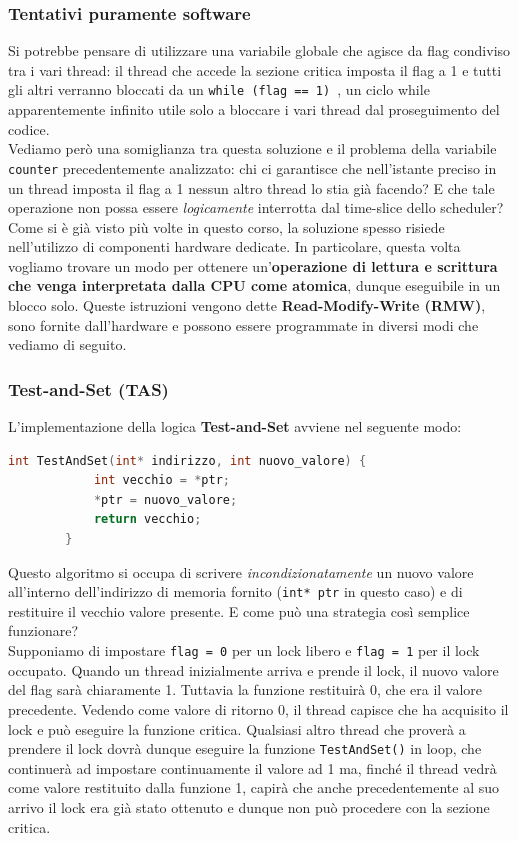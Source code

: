 \documentclass[12pt]{report}
\begin{document}
	\subsubsection*{Tentativi puramente software}
	Si potrebbe pensare di utilizzare una variabile globale che agisce da flag condiviso tra i vari thread: il thread che accede la sezione critica imposta il flag a 1 e tutti gli altri verranno bloccati da un \texttt{while (flag == 1) {}}, un ciclo while apparentemente infinito utile solo a bloccare i vari thread dal proseguimento del codice.\\
	Vediamo però una somiglianza tra questa soluzione e il problema della variabile \texttt{counter} precedentemente analizzato: chi ci garantisce che nell'istante preciso in un thread imposta il flag a 1 nessun altro thread lo stia già facendo? E che tale operazione non possa essere \textit{logicamente} interrotta dal time-slice dello scheduler?\\
	Come si è già visto più volte in questo corso, la soluzione spesso risiede nell'utilizzo di componenti hardware dedicate. In particolare, questa volta vogliamo trovare un modo per ottenere un'\textbf{operazione di lettura e scrittura che venga interpretata dalla CPU come atomica}, dunque eseguibile in un blocco solo. Queste istruzioni vengono dette \textbf{Read-Modify-Write (RMW)}, sono fornite dall'hardware e possono essere programmate in diversi modi che vediamo di seguito.
	
	\subsubsection*{Test-and-Set (TAS)}
	L'implementazione della logica \textbf{Test-and-Set} avviene nel seguente modo:
	\begin{lstlisting}[language=C]
		int TestAndSet(int* indirizzo, int nuovo_valore) {
			int vecchio = *ptr;
			*ptr = nuovo_valore;
			return vecchio;
		}
	\end{lstlisting}
	Questo algoritmo si occupa di scrivere \textit{incondizionatamente} un nuovo valore all'interno dell'indirizzo di memoria fornito (\texttt{int* ptr} in questo caso) e di restituire il vecchio valore presente. E come può una strategia così semplice funzionare?\\
	Supponiamo di impostare \texttt{flag = 0} per un lock libero e \texttt{flag = 1} per il lock occupato. Quando un thread inizialmente arriva e prende il lock, il nuovo valore del flag sarà chiaramente 1. Tuttavia la funzione restituirà 0, che era il valore precedente. Vedendo come valore di ritorno 0, il thread capisce che ha acquisito il lock e può eseguire la funzione critica. Qualsiasi altro thread che proverà a prendere il lock dovrà dunque eseguire la funzione \texttt{TestAndSet()} in loop, che continuerà ad impostare continuamente il valore ad 1 ma, finché il thread vedrà come valore restituito dalla funzione 1, capirà che anche precedentemente al suo arrivo il lock era già stato ottenuto e dunque non può procedere con la sezione critica.
	
\end{document}
